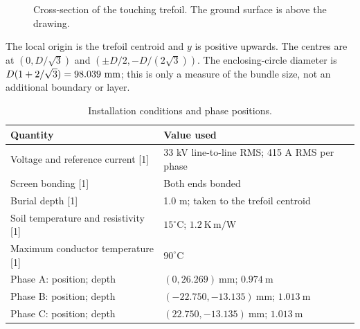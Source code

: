\documentclass[11pt,a4paper]{article}
\begin{document}
\begin{figure}[H]\centering
{}
\caption{Cross-section of the touching trefoil. The ground surface is above the drawing.}
\end{figure}

The local origin is the trefoil centroid and \(y\) is positive upwards.
The centres are at \((0,D/\sqrt3)\) and
\((\pm D/2,-D/(2\sqrt3))\). The enclosing-circle diameter is
\(D(1+2/\sqrt3)=98.039~\mathrm{mm}\); this is only a measure of
the bundle size, not an additional boundary or layer.

\begin{table}[H]\centering\small
\caption{Installation conditions and phase positions.}
\label{tab:rating}
\begin{tabularx}{\linewidth}{@{}l Y@{}}
\toprule
Quantity & Value used\\
\midrule
Voltage and reference current [1] & 33 kV line-to-line RMS; 415 A RMS per phase\\
Screen bonding [1] & Both ends bonded\\
Burial depth [1] & 1.0 m; taken to the trefoil centroid\\
Soil temperature and resistivity [1] & \(15^\circ\mathrm C\); \(1.2~\mathrm{K\,m/W}\)\\
Maximum conductor temperature [1] & \(90^\circ\mathrm C\)\\
Phase A: position; depth & \((0,26.269)~\mathrm{mm}\); \(0.974~\mathrm m\)\\
Phase B: position; depth & \((-22.750,-13.135)~\mathrm{mm}\); \(1.013~\mathrm m\)\\
Phase C: position; depth & \((22.750,-13.135)~\mathrm{mm}\); \(1.013~\mathrm m\)\\
\bottomrule
\end{tabularx}
\end{table}
\end{document}
